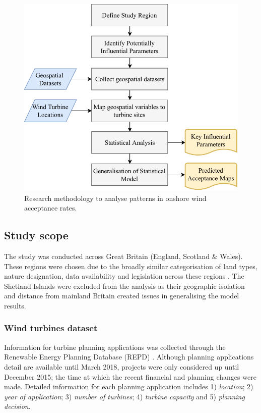 \documentclass[a4paper,]{article}
\theoremstyle{definition}
\theoremstyle{definition}
\theoremstyle{definition}
\theoremstyle{remark}
\begin{document}
\begin{figure}[h]

{\centering \includegraphics[width=0.75\linewidth]{../_figures/Flowchart/ResearchApproach} 

}

\caption{Research methodology to analyse patterns in onshore wind acceptance rates.}\label{fig:Methodology}
\end{figure}

\hypertarget{study-scope}{%
\subsection{Study scope}\label{study-scope}}

The study was conducted across Great Britain (England, Scotland \& Wales). These regions were chosen due to the broadly similar categorisation of land types, nature designation, data availability and legislation across these regions \citep{HMGovernment2014}. The Shetland Islands were excluded from the analysis as their geographic isolation and distance from mainland Britain created issues in generalising the model results.

\hypertarget{wind-turbines-dataset}{%
\subsubsection{Wind turbines dataset}\label{wind-turbines-dataset}}

Information for turbine planning applications was collected through the Renewable Energy Planning Database (REPD) \citep{DECC2018}. Although planning applications detail are available until March 2018, projects were only considered up until December 2015; the time at which the recent financial and planning changes were made. Detailed information for each planning application includes 1) \emph{location}; 2) \emph{year of application}; 3) \emph{number of turbines}; 4) \emph{turbine capacity} and 5) \emph{planning decision}.
\end{document}
